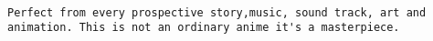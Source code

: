 \documentclass[
]{article}
\begin{document}
\begin{verbatim}
                                                                                                                                                                                                                                                                                                                                                                                                                                                                                                                                                                                                                                                                                                                                                                                                                                                                                                                                                                                                                                                                                                                                                                                                                                                                                                                                                                                                                                                                                                                                                                                                                                                                                                                                                                                                                                                                                                                                                                                                                                                                                                                                                                                                                                                                                                                                                                                                                                                                                                                                                                                                                                                                                                                                                                                                                                                                                                                                                                                                                                                                                                                                  Perfect from every prospective story,music, sound track, art and animation. This is not an ordinary anime it's a masterpiece.

\end{verbatim}
\end{document}
